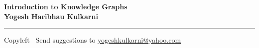 
\graphicspath{{images/}}

\footnotesize


\begin{center}
\Large{\textbf{Introduction to Knowledge Graphs\\ Yogesh Haribhau Kulkarni}}  
\end{center}

\begin{multicols}{2}


\end{multicols}

\rule{\linewidth}{0.25pt}
\scriptsize
Copyleft \textcopyleft\  Send suggestions to 
\href{http://www.yogeshkulkarni.com}{yogeshkulkarni@yahoo.com}


